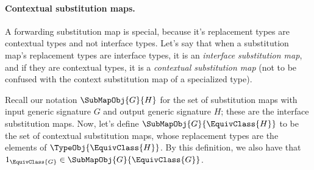 \documentclass[../generics]{subfiles}
\begin{document}
\paragraph{Contextual substitution maps.} A forwarding substitution map is special, because it's replacement types are contextual types and not interface types. Let's say that when a substitution map's replacement types are interface types, it is an \emph{interface substitution map}, and if they are contextual types, it is a \emph{contextual substitution map} (not to be confused with the context substitution map of a specialized type).

Recall our notation $\SubMapObj{G}{H}$ for the set of substitution maps with input generic signature $G$ and output generic signature $H$; these are the interface substitution maps. Now, let's define $\SubMapObj{G}{\EquivClass{H}}$ to be the set of contextual substitution maps, whose replacement types are the elements of  $\TypeObj{\EquivClass{H}}$. By this definition, we also have that $1_{\EquivClass{G}}\in\SubMapObj{G}{\EquivClass{G}}$.
\end{document}
